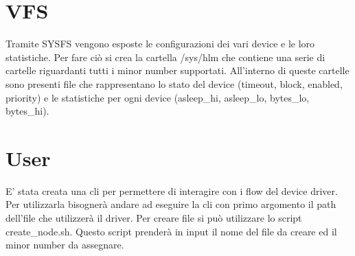 \documentclass[a4paper,10pt]{article}
\begin{document}
\section{VFS}
Tramite SYSFS vengono esposte le configurazioni dei vari device e le loro statistiche. Per fare ciò si crea la cartella /sys/hlm che contiene una serie di cartelle riguardanti tutti i minor number supportati. All'interno di queste cartelle sono presenti file che rappresentano lo stato del device (timeout, block, enabled, priority) e le statistiche per ogni device (asleep\_hi, asleep\_lo, bytes\_lo, bytes\_hi).

\section{User}
E' stata creata una cli per permettere di interagire con i flow del device driver. Per utilizzarla bisognerà andare ad eseguire la cli con primo argomento il path dell'file che utilizzerà il driver. Per creare file si può utilizzare lo script create\_node.sh. Questo script prenderà in input il nome del file da creare ed il minor number da assegnare.
\end{document}
